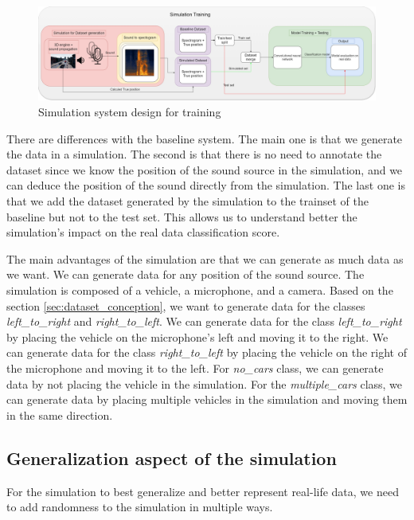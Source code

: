 \begin{figure}[H]
    \centering
    \includegraphics[width=1\textwidth]{../Images/simulation_training_design.drawio.png}
    \caption{Simulation system design for training}
    \label{fig:simulation_system_design.drawio}
\end{figure}

There are differences with the baseline system. The main one is that we generate the data in a simulation. The second is that there is no need to annotate the dataset since we know the position of the sound source in the simulation, and we can deduce the position of the sound directly from the simulation. The last one is that we add the dataset generated by the simulation to the trainset of the baseline but not to the test set. This allows us to understand better the simulation's impact on the real data classification score.

The main advantages of the simulation are that we can generate as much data as we want. We can generate data for any position of the sound source. The simulation is composed of a vehicle, a microphone, and a camera. Based on the section \ref{sec:dataset_conception}, we want to generate data for the classes \textit{left\_to\_right} and \textit{right\_to\_left}. We can generate data for the class \textit{left\_to\_right} by placing the vehicle on the microphone's left and moving it to the right. We can generate data for the class \textit{right\_to\_left} by placing the vehicle on the right of the microphone and moving it to the left. For \textit{no\_cars} class, we can generate data by not placing the vehicle in the simulation. For the \textit{multiple\_cars} class, we can generate data by placing multiple vehicles in the simulation and moving them in the same direction. 

\subsection{Generalization aspect of the simulation} %

For the simulation to best generalize and better represent real-life data, we need to add randomness to the simulation in multiple ways. 

